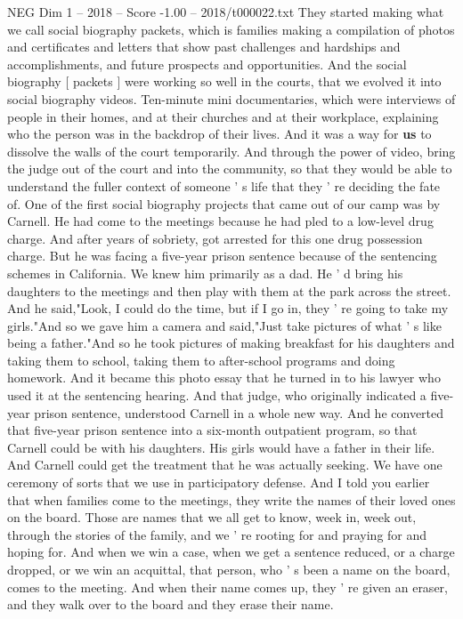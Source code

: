 \begin{textsample}{NEG Dim 1 – 2018 – Score -1.00 – 2018/t000022.txt}
They started making what we call social biography packets, which is families making a compilation of photos and certificates and letters that show past challenges and hardships and accomplishments, and future prospects and opportunities.
And the social biography [ packets ] were working so well in the courts, that we evolved it into social biography videos.
Ten-minute mini documentaries, which were interviews of people in their homes, and at their churches and at their workplace, explaining who the person was in the backdrop of their lives.
And it was a way for \textbf{us} to dissolve the walls of the court temporarily.
And through the power of video, bring the judge out of the court and into the community, so that they would be able to understand the fuller context of someone ' s life that they ' re deciding the fate of.
One of the first social biography projects that came out of our camp was by Carnell.
He had come to the meetings because he had pled to a low-level drug charge.
And after years of sobriety, got arrested for this one drug possession charge.
But he was facing a five-year prison sentence because of the sentencing schemes in California.
We knew him primarily as a dad.
He ' d bring his daughters to the meetings and then play with them at the park across the street.
And he said,"Look, I could do the time, but if I go in, they ' re going to take my girls."And so we gave him a camera and said,"Just take pictures of what ' s like being a father."And so he took pictures of making breakfast for his daughters and taking them to school, taking them to after-school programs and doing homework.
And it became this photo essay that he turned in to his lawyer who used it at the sentencing hearing.
And that judge, who originally indicated a five-year prison sentence, understood Carnell in a whole new way.
And he converted that five-year prison sentence into a six-month outpatient program, so that Carnell could be with his daughters.
His girls would have a father in their life.
And Carnell could get the treatment that he was actually seeking.
We have one ceremony of sorts that we use in participatory defense.
And I told you earlier that when families come to the meetings, they write the names of their loved ones on the board.
Those are names that we all get to know, week in, week out, through the stories of the family, and we ' re rooting for and praying for and hoping for.
And when we win a case, when we get a sentence reduced, or a charge dropped, or we win an acquittal, that person, who ' s been a name on the board, comes to the meeting.
And when their name comes up, they ' re given an eraser, and they walk over to the board and they erase their name.

\end{textsample}
